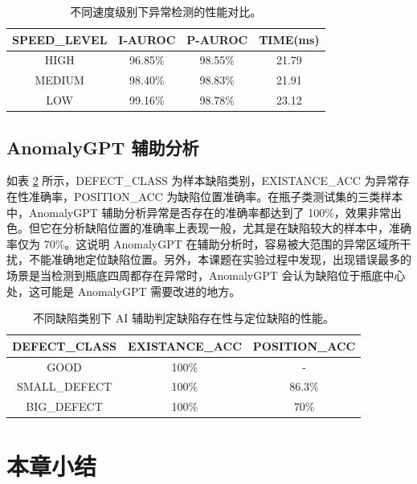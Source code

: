 \documentclass[
  ]{njuthesis}
\begin{document}
\begin{table}[H]
    \centering
    \caption{不同速度级别下异常检测的性能对比。}
    \label{speed_level_comparison}
    \renewcommand\arraystretch{0.8}
    \begin{tabular}{cccc}
    \toprule
    SPEED\_LEVEL & I-AUROC & P-AUROC & TIME(ms) \\
    \midrule
    HIGH & 96.85\% & 98.55\% & 21.79 \\
    MEDIUM & 98.40\% & 98.83\% & 21.91 \\
    LOW & 99.16\% & 98.78\% & 23.12 \\
    \bottomrule
    \end{tabular}
\end{table}

\subsection{AnomalyGPT 辅助分析}

如表 \ref{AI_detection_accuracy} 所示，DEFECT\_CLASS 为样本缺陷类别，EXISTANCE\_ACC 为异常存在性准确率，POSITION\_ACC 为缺陷位置准确率。在瓶子类测试集的三类样本中，AnomalyGPT 辅助分析异常是否存在的准确率都达到了 100\%，效果非常出色。但它在分析缺陷位置的准确率上表现一般，尤其是在缺陷较大的样本中，准确率仅为 70\%。这说明 AnomalyGPT 在辅助分析时，容易被大范围的异常区域所干扰，不能准确地定位缺陷位置。另外，本课题在实验过程中发现，出现错误最多的场景是当检测到瓶底四周都存在异常时，AnomalyGPT 会认为缺陷位于瓶底中心处，这可能是 AnomalyGPT 需要改进的地方。

\begin{table}[H]
    \centering
    \caption{不同缺陷类别下 AI 辅助判定缺陷存在性与定位缺陷的性能。}
    \label{AI_detection_accuracy}
    \renewcommand\arraystretch{0.8}
    \begin{tabular}{ccc}
    \toprule
    DEFECT\_CLASS & EXISTANCE\_ACC & POSITION\_ACC \\
    \midrule
    GOOD & 100\% & - \\
    SMALL\_DEFECT & 100\% & 86.3\% \\
    BIG\_DEFECT & 100\% & 70\% \\
    \bottomrule
    \end{tabular}
\end{table}

\section{本章小结}
\end{document}
